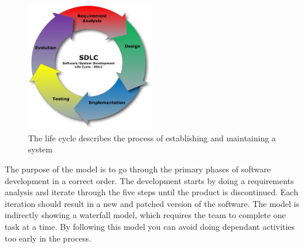\begin{figure}[h!]
\centering
\includegraphics[width=0.5\textwidth]{graphics/Software_Development_Life_Cycle}
\caption{The life cycle describes the process of establishing and maintaining a system}
\label{SDLC}
\end{figure}

The purpose of the model is to go through the primary phases of software development in a correct order. 
The development starts by doing a requirements analysis and iterate through the five steps until the product is discontinued.
Each iteration should result in a new and patched version of the software. 
The model is indirectly showing a waterfall model, which requires the team to complete one task at a time. 
By following this model you can avoid doing dependant activities too early in the process.
